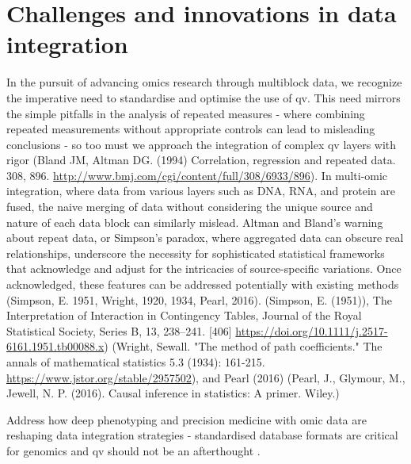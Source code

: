 \section{Challenges and innovations in data integration}
In the pursuit of advancing omics research through multiblock data, we recognize the imperative need to standardise and optimise the use of \ac{qv}. 
This need mirrors the simple pitfalls in the analysis of repeated measures
 - where combining repeated measurements without appropriate controls can lead to misleading conclusions - 
 so too must we approach the integration of complex \ac{qv} layers with rigor
 (Bland JM, Altman DG. (1994) Correlation, regression and repeated data. 308, 896. \url{http://www.bmj.com/cgi/content/full/308/6933/896}).
In multi-omic integration, where data from various layers such as DNA, RNA, and protein are fused, the naive merging of data without considering the unique source and nature of each data block can similarly mislead. 
Altman and Bland's  warning about repeat data, or Simpson's paradox, where aggregated data can obscure real relationships, underscore the necessity for sophisticated statistical frameworks that acknowledge and adjust for the intricacies of source-specific variations.
Once acknowledged, these features can be addressed potentially with existing methods
(Simpson, E. 1951, 
Wright, 1920, 1934, 
Pearl, 2016).
(Simpson, E. (1951)), The Interpretation of Interaction in Contingency Tables, Journal of the Royal Statistical Society, Series B, 13, 238–241. [406] \url{https://doi.org/10.1111/j.2517-6161.1951.tb00088.x})
(Wright, Sewall. "The method of path coefficients." The annals of mathematical statistics 5.3 (1934): 161-215.
\url{https://www.jstor.org/stable/2957502}),
and Pearl (2016) (Pearl, J., Glymour, M.,  Jewell, N. P. (2016). Causal inference in statistics: A primer. Wiley.) 

Address how deep phenotyping and precision medicine with omic data are reshaping data integration strategies - standardised database formats are critical for genomics and \ac{qv} should not be an afterthought \cite{bycroft2018uk, all2024genomic, ogishima2021dbtmm}.










